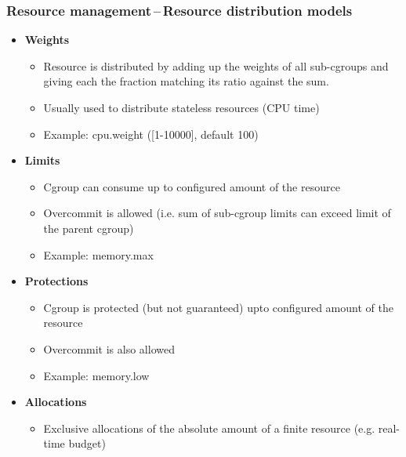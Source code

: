 \documentclass[serif]{beamer}
\begin{document}
\begin{frame}
  \frametitle{Resource management\,--\,Resource distribution models}

  \begin{itemize}
  \item \textbf{Weights}
    \begin{itemize}
    \item Resource is distributed by adding up the weights of all sub-cgroups and giving each the fraction matching its ratio against the sum.
    \item Usually used to distribute stateless resources (CPU time)
    \item Example: cpu.weight ([1-10000], default 100)
    \end{itemize}
    \pause

  \item \textbf{Limits}
    \begin{itemize}
    \item Cgroup can consume up to configured amount of the resource
    \item Overcommit is allowed (i.e. sum of sub-cgroup limits can exceed limit of the parent cgroup)
    \item Example: memory.max
    \end{itemize}
    \pause

  \item \textbf{Protections}
    \begin{itemize}
    \item Cgroup is protected (but not guaranteed) upto configured amount of the resource
    \item Overcommit is also allowed
    \item Example: memory.low
    \end{itemize}
    \pause

  \item \textbf{Allocations}
    \begin{itemize}
    \item Exclusive allocations of the absolute amount of a finite resource (e.g. real-time budget)
    \end{itemize}
  \end{itemize}
\end{frame}
\end{document}

